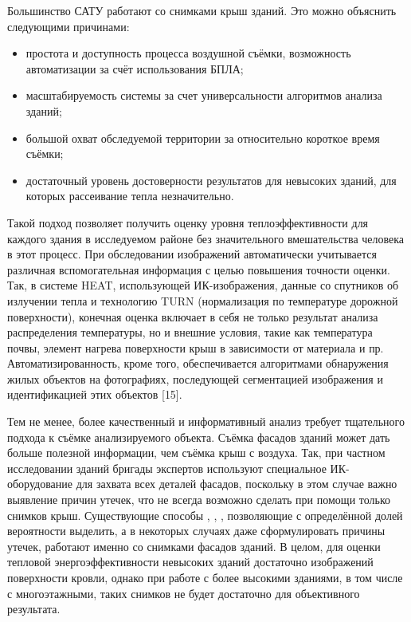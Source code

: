 	Большинство САТУ работают со снимками крыш зданий. Это можно объяснить следующими причинами:
	\begin{itemize}
		\item простота и доступность процесса воздушной съёмки, возможность автоматизации за счёт использования БПЛА;
		\item масштабируемость системы за счет универсальности алгоритмов анализа зданий;
		\item большой охват обследуемой территории за относительно короткое время съёмки;
		\item достаточный уровень достоверности результатов для невысоких зданий, для которых рассеивание тепла незначительно.
	\end{itemize}

	Такой подход позволяет получить оценку уровня теплоэффективности для каждого здания в исследуемом районе без значительного вмешательства человека в этот процесс. При обследовании изображений автоматически учитывается различная вспомогательная информация с целью повышения точности оценки. Так, в системе HEAT, использующей ИК-изображения, данные со спутников об излучении тепла и технологию {TURN} (нормализация по температуре дорожной поверхности), конечная оценка включает в себя не только результат анализа распределения температуры, но и внешние условия, такие как температура почвы, элемент нагрева поверхности крыш в зависимости от материала и пр. Автоматизированность, кроме того, обеспечивается алгоритмами обнаружения жилых объектов на фотографиях, последующей сегментацией изображения и идентификацией этих объектов [15].

	Тем не менее, более качественный и информативный анализ требует тщательного подхода к съёмке анализируемого объекта. Съёмка фасадов зданий может дать больше полезной информации, чем съёмка крыш с воздуха. Так, при частном исследовании зданий бригады экспертов используют специальное ИК-оборудование для захвата всех деталей фасадов, поскольку в этом случае важно выявление причин утечек, что не всегда возможно сделать при помощи только снимков крыш. Существующие способы \cite{problem:detection-windows-doors}, \cite{problem:aerial-oblique}, \cite{problem:thermal-leakages-facades}, позволяющие с определённой долей вероятности выделить, а в некоторых случаях даже сформулировать \cite{problem:knowledge-based-system} причины утечек, работают именно со снимками фасадов зданий. В целом, для оценки тепловой энергоэффективности невысоких зданий достаточно изображений поверхности кровли, однако при работе с более высокими зданиями, в том числе с многоэтажными, таких снимков не будет достаточно для объективного результата. 

